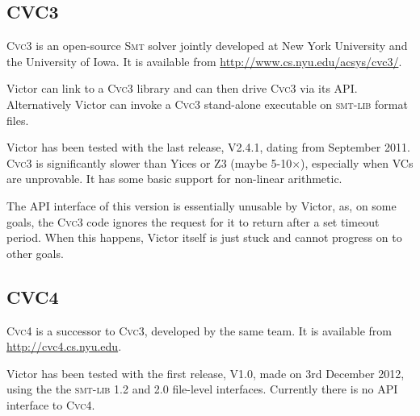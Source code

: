 \documentclass[12pt,fleqn]{article}
\newcommand{\spark}{\textsc{Spark}}
\newcommand{\cvcthree}{\textsc{Cvc}3}
\newcommand{\cvcfour}{\textsc{Cvc}4}
\newcommand{\zthree}{\textsc{Z}3}
\newcommand{\yices}{Yices}
\newcommand{\smt}{\textsc{Smt}}
\newcommand{\smtlib}{\textsc{smt-lib}}
\begin{document}
\subsection{CVC3}

\cvcthree{} is an open-source \smt{} solver jointly developed at New
York University and the University of Iowa.  It is available from
\url{http://www.cs.nyu.edu/acsys/cvc3/}.

Victor can link to a \cvcthree{} library and can then drive
\cvcthree{} via its API.  Alternatively Victor can invoke a
\cvcthree{} stand-alone executable on \smtlib{} format files.

Victor has been tested with the last release, V2.4.1, dating from
September 2011.
%
%
\cvcthree{} is significantly slower than \yices{} or \zthree{} (maybe
5-10$\times$), especially when VCs are unprovable. 
%
It has some basic support for non-linear arithmetic.

The API interface of this version is essentially unusable by Victor,
as, on some goals, the \cvcthree{} code ignores the request for it to
return after a set timeout period.  When this happens, Victor itself
is just stuck and cannot progress on to other goals.


\subsection{CVC4}
\cvcfour{} is a successor to \cvcthree, developed by the same team.
It is available from \url{http://cvc4.cs.nyu.edu}.

Victor has been tested with the first release, V1.0, made on 3rd December 2012, 
using the the \smtlib{} 1.2 and 2.0 file-level interfaces.  Currently there
is no API interface to \cvcfour.
\end{document}

